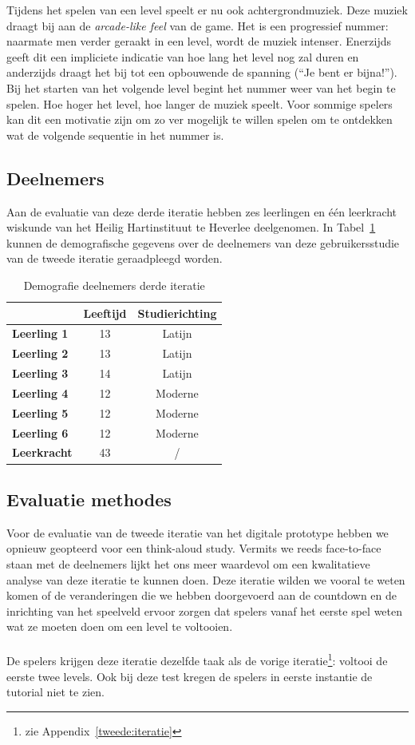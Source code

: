 \documentclass[11pt]{article}
\begin{document}
Tijdens het spelen van een level speelt er nu ook achtergrondmuziek. Deze muziek draagt bij aan de \textit{arcade-like feel} van de game. Het is een progressief nummer: naarmate men verder geraakt in een level, wordt de muziek intenser. Enerzijds geeft dit een impliciete indicatie van hoe lang het level nog zal duren en anderzijds draagt het bij tot een opbouwende de spanning (``Je bent er bijna!''). Bij het starten van het volgende level begint het nummer weer van het begin te spelen. Hoe hoger het level, hoe langer de muziek speelt. Voor sommige spelers kan dit een motivatie zijn om zo ver mogelijk te willen spelen om te ontdekken wat de volgende sequentie in het nummer is.
    
    \subsection{Deelnemers}
Aan de evaluatie van deze derde iteratie hebben zes leerlingen en \'e\'en leerkracht wiskunde van het Heilig Hartinstituut te Heverlee deelgenomen. In Tabel~\ref{demografie:derde:iteratie} kunnen de demografische gegevens over de deelnemers van deze gebruikersstudie van de tweede iteratie geraadpleegd worden.
        \begin{table}[H]
		\centering
		\begin{tabular}{l|c|c}
			& \textbf{Leeftijd} & \textbf{Studierichting} \\ \hline
			\textbf{Leerling 1} & 13 & Latijn \\\hline
			\textbf{Leerling 2} & 13 & Latijn \\\hline
			\textbf{Leerling 3} & 14 & Latijn \\\hline
			\textbf{Leerling 4} & 12 & Moderne \\\hline
            \textbf{Leerling 5} & 12 & Moderne\\\hline
            \textbf{Leerling 6} & 12 & Moderne\\\hline
			\textbf{Leerkracht} & 43 & / \\
		\end{tabular}
		\caption{Demografie deelnemers derde iteratie}\label{demografie:derde:iteratie}
    \end{table}
    
    \subsection{Evaluatie methodes}
Voor de evaluatie van de tweede iteratie van het digitale prototype hebben we opnieuw geopteerd voor een think-aloud study. Vermits we reeds face-to-face staan met de deelnemers lijkt het ons meer waardevol om een  kwalitatieve analyse van deze iteratie te kunnen doen. Deze iteratie wilden we vooral te weten komen of de veranderingen die we hebben doorgevoerd aan de countdown en de inrichting van het speelveld ervoor zorgen dat spelers vanaf het eerste spel weten wat ze moeten doen om een level te voltooien.\\\\
De spelers krijgen deze iteratie dezelfde taak als de vorige iteratie\footnote{zie Appendix~\ref{tweede:iteratie}}: voltooi de eerste twee levels. Ook bij deze test kregen de spelers in eerste instantie de tutorial niet te zien.
\end{document}
